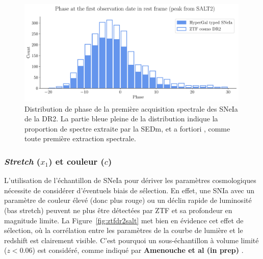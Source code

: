 \documentclass[../main/main.tex]{subfiles}
\begin{document}
\begin{figure}[ht]
  \centering
  \includegraphics[width=0.99\textwidth]{../figures/09_dr2/phaseIadr2.pdf}
  \caption[Distribution de phase de la première acquisition spectrale
  des SNeIa de la DR2.]{Distribution de phase de la première acquisition spectrale
  des SNeIa de la DR2. La partie bleue pleine de la distribution indique
la proportion de spectre extraite par la SEDm, et a fortiori \hypergal,
comme toute première extraction spectrale.}
  \label{fig:phaseIa}
\end{figure}

\subsubsection{\textit{Stretch} ($x_{1}$) et couleur ($c$)}

L'utilisation de l'échantillon de SNeIa pour dériver les paramètres
cosmologiques nécessite de considérer d'éventuels biais de sélection. En
effet, une SNIa avec un paramètre de couleur élevé (donc plus rouge) ou
un déclin rapide de luminosité (bas stretch) peuvent ne plus être détectées
par ZTF et sa profondeur en magnitude limite. La
Figure~\ref{fig:ztfdr2salt} met bien en évidence cet effet de sélection,
où la corrélation entre les paramètres de la courbe de lumière et le
redshift est clairement visible. C'est pourquoi un sous-échantillon à
volume limité ($z<0.06$) est considéré, comme indiqué par \textbf{Amenouche et al (in prep)} .
\end{document}
